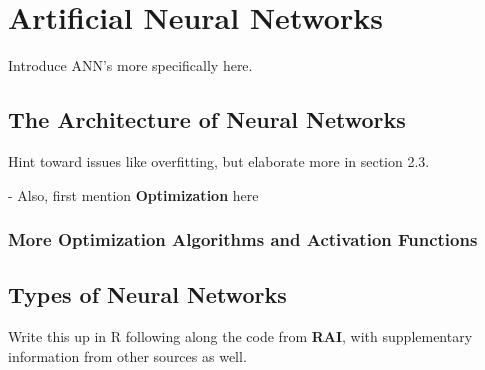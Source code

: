 \chapter{Artificial Neural Networks}
Introduce ANN's more specifically here.












\section{The Architecture of Neural Networks} %

Hint toward issues like overfitting, but elaborate more in section 2.3.

- Also, first mention \textbf{Optimization} here






\subsection{More Optimization Algorithms and Activation Functions}

\section{Types of Neural Networks} %

Write this up in R following along the code from \textbf{RAI}, with supplementary information from other sources as well.  

